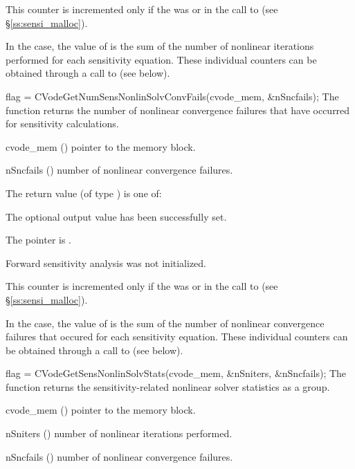 {
  This counter is incremented only if the  was  or 
   in the call to  (see \S\ref{ss:sensi_malloc}).
  
  In the  case, the value of  is the sum of 
  the number of nonlinear iterations performed for each sensitivity equation.
  These individual counters can be obtained through a call to
   (see below).
}
{
  flag = CVodeGetNumSensNonlinSolvConvFails(cvode\_mem, \&nSncfails);
}
{
  The function  returns the
  number of nonlinear convergence failures that have occurred for
  sensitivity calculations.
}
{
  \begin{args}
  \item[cvode\_mem] ()
    pointer to the {\cvodes} memory block.
  \item[nSncfails] ()
    number of nonlinear convergence failures.
  \end{args}
}
{
  The return value  (of type ) is one of:
  \begin{args}
  \item[\Id{CV\_SUCCESS}] 
    The optional output value has been successfully set.
  \item[\Id{CV\_MEM\_NULL}]
    The  pointer is .
  \item[\Id{CV\_NO\_SENS}]
    Forward sensitivity analysis was not initialized.
  \end{args}
}
{
  This counter is incremented only if the  was  or 
   in the call to  (see \S\ref{ss:sensi_malloc}).
  
  In the  case, the value of  is the sum of 
  the number of nonlinear convergence failures that occured for each sensitivity equation.
  These individual counters can be obtained through a call to
   (see below).
}
{
  flag = CVodeGetSensNonlinSolvStats(cvode\_mem, \&nSniters, \&nSncfails);
}
{
  The function  returns the sensitivity-related
  nonlinear solver statistics as a group.
}
{
  \begin{args}
  \item[cvode\_mem] ()
    pointer to the {\cvodes} memory block.
  \item[nSniters] ()
    number of nonlinear iterations performed.
  \item[nSncfails] ()
    number of nonlinear convergence failures.
  \end{args}
}
